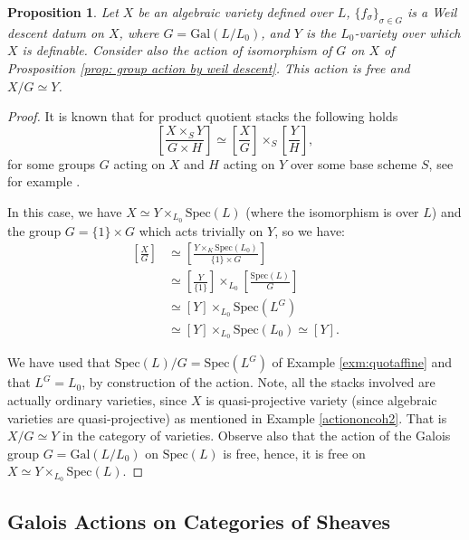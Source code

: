 \documentclass[10pt]{amsart}
\newtheorem{proposition}[theorem]{Proposition}
\theoremstyle{definition}
\newcommand{\Spe}{ {\mathrm{Spec} } }
\newcommand{\Gal}{{ \mathrm{Gal}}}
\begin{document}
\begin{proposition}\label{prop:actiononvariety}
    Let $X$ be an algebraic variety defined over $L$, $\{ f_\sigma \}_{\sigma \in G}$ is a Weil descent datum on $X$, where $G=\Gal(L/L_0)$, and $Y$ is the $L_0$-variety over which $X$ is definable. Consider also the action of isomorphism of $G$ on $X$ of Prosposition \ref{prop: group action by weil descent}. This action is free and $X/G \simeq Y$.  
\end{proposition}
\begin{proof}
It is known that for product quotient stacks the following holds
\begin{equation}
\label{eq:fibreProdStacks}
\left[
\frac{X \times_S Y}{G\times H} 
\right]
 \simeq 
 \left[
 \frac{X}{G} 
 \right] \times_S 
 \left[
 \frac{Y}{H} 
 \right],
\end{equation}
for some groups $G$ acting on $X$ and $H$ acting on $Y$ over some base scheme $S$,
see for example \cite{152738}.

In this case, we have $X \simeq Y \times_{L_0} \mathrm{Spec}(L)$ (where the isomorphism is over $L$) and the group $G = \{1\} \times G$ which acts trivially on $Y$, so we have:
\begin{align*}
\left[ \frac{X}{G} \right] &\simeq 
\left[  \frac{Y\times_K \mathrm{Spec}(L_0)}{\{1\}\times G} \right]  \\
& \simeq 
\left[ \frac{Y}{\{1\}} \right]\times_{L_0} \left[ \frac{\mathrm{Spec}(L)}{G} \right] \\
& \simeq [Y] \times_{L_0} \mathrm{Spec}(L^G) \\ 
& \simeq [Y] \times_{L_0} \mathrm{Spec}(L_0) \simeq [Y]. 
\end{align*}

We have used that $\Spe(L)/G = \Spe(L^G)$ of Example \ref{exm:quotaffine} and that $L^G = L_0$, by construction of the action.
Note, all the stacks involved are actually ordinary varieties, since $X$ is quasi-projective variety (since algebraic varieties are quasi-projective) as mentioned in Example \ref{actiononcoh2}. That is $X/G \simeq Y$ in the category of varieties.
Observe also that the action of the Galois group $G=\Gal(L/L_0)$ on $\Spe(L)$ is free, hence, it is free on $X \simeq Y \times_{L_0} \Spe(L)$.  
\end{proof}


  \subsection{Galois Actions on Categories of Sheaves}   
 
\end{document}
